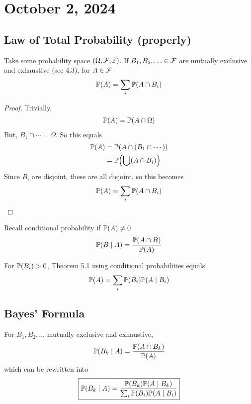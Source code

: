 \section{October 2, 2024}

\subsection{Law of Total Probability (properly)}
\begin{theorem}
    Take some probability space $(\Omega, \mathcal{F}, \mathbb{P})$. If $B_1, B_2, \ldots \in \mathcal{F}$ are mutually exclusive and exhaustive (see 4.3), for $A \in \mathcal{F}$
    \begin{align}
        \mathbb{P}(A) = \sum_{i} \mathbb{P}(A \cap B_i)
    \end{align}
\end{theorem}
\begin{proof}
    Trivially,
    \begin{align}
        \mathbb{P}(A) = \mathbb{P}(A \cap \Omega)
    \end{align}
    But, $B_1 \cap \cdots = \Omega$. So this equals
    \begin{align}
        \mathbb{P}(A) &= \mathbb{P}\qty(A \cap (B_1 \cap \cdots))\\
        &= \mathbb{P}\qty(\bigcup(A \cap B_i))
    \end{align}
    Since $B_i$ are disjoint, these are all disjoint, so this becomes
    \begin{align}
        \mathbb{P}(A) = \sum_i \mathbb{P}(A \cap B_i)
    \end{align}
\end{proof}

Recall conditional probability if $\mathbb{P}(A) \ne 0$
\begin{align}
    \mathbb{P}(B \mid A) = \dfrac{\mathbb{P}(A \cap B)}{\mathbb{P}(A)}
\end{align}

\begin{theorem}
    For $\mathbb{P}(B_i) > 0$, Theorem 5.1 using conditional probabilities equals
    \begin{align}
        \mathbb{P}(A) = \sum_i \mathbb{P}(B_i) \mathbb{P}(A \mid B_i)
    \end{align}
\end{theorem}

\subsection{Bayes' Formula}
\begin{proposition}
    For $B_1, B_2, \ldots$ mutually exclusive and exhaustive,
    \begin{align}
        \mathbb{P}(B_k \mid A) = \dfrac{\mathbb{P}(A \cap B_k)}{\mathbb{P}(A)}
    \end{align}
    which can be rewritten into
    \begin{align}
        \boxed{\mathbb{P}(B_k \mid A) = \dfrac{\mathbb{P}(B_k) \mathbb{P}(A \mid B_k)}{\sum_i \mathbb{P}(B_i) \mathbb{P}(A \mid B_i)}}
    \end{align}
\end{proposition}

